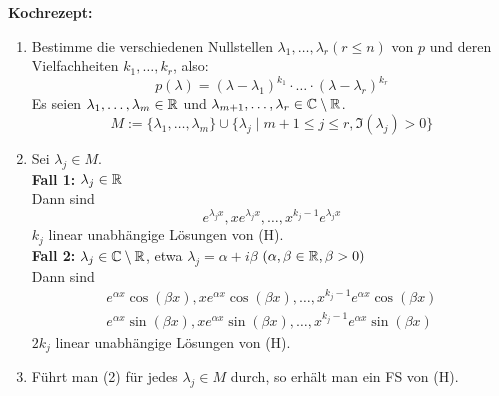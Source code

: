 \documentclass[a4paper,twoside,DIV15,BCOR12mm,chapterprefix=true,headings=twolinechapter]{scrbook}
\begin{document}
\textbf{Kochrezept:}
\begin{enumerate}
\item Bestimme die verschiedenen Nullstellen $\lambda_1,\ldots,\lambda_r (r\le n)$ von $p$
und deren Vielfachheiten $k_1,\ldots,k_r$, also:
\[p(\lambda)=(\lambda-\lambda_1)^{k_1}\cdot\ldots\cdot(\lambda-\lambda_r)^{k_r}\]
Es seien $\lambda_1,\ldots,\lambda_m\in\mathbb{R}$ und $\lambda_{m+1},\ldots,\lambda_r\in\mathbb{C}\setminus\mathbb{R}$.
\[M:=\{\lambda_1,\ldots,\lambda_m\}\cup\{\lambda_j\mid m+1\le j\le r,\Im(\lambda_j)>0\}\]
\item Sei $\lambda_j\in M$.\\
\textbf{Fall 1:} $\lambda_j\in\mathbb{R}$\\
Dann sind
\[e^{\lambda_jx},xe^{\lambda_jx},\ldots,x^{k_j-1}e^{\lambda_jx}\]
$k_j$ linear unabhängige Lösungen von (H).\\
\textbf{Fall 2:} $\lambda_j\in\mathbb{C}\setminus\mathbb{R}$, etwa $\lambda_j=\alpha+i\beta$ $(\alpha,\beta\in\mathbb{R},\beta>0)$\\
Dann sind
\begin{align*}
e^{\alpha x}\cos(\beta x), xe^{\alpha x}\cos(\beta x),\ldots,x^{k_j-1}e^{\alpha x}\cos(\beta x)\\
e^{\alpha x}\sin(\beta x), xe^{\alpha x}\sin(\beta x),\ldots,x^{k_j-1}e^{\alpha x}\sin(\beta x)
\end{align*}
$2k_j$ linear unabhängige Lösungen von (H).
\item Führt man (2) für jedes $\lambda_j\in M$ durch, so erhält man ein FS von (H).
\end{enumerate}
\end{document}
